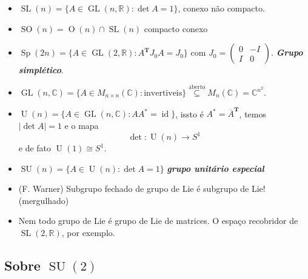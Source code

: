 \begin{example}
\begin{itemize}
\begin{itemize}
	\item $\operatorname{SL}(n) =\{A\in\operatorname{GL}(n,\mathbb{R}):\det A=1\}$, conexo n\~ao compacto.

	\item $\operatorname{SO}(n) =\operatorname{O}(n) \cap \operatorname{SL}(n)$ compacto conexo

	\item $\operatorname{Sp}(2n) =\{A\in\operatorname{GL}(2,\mathbb{R}):A^{\mathbf{T}}J_0A=J_0\}$ com $J_0=\begin{pmatrix} 0&-I\\I&0 \end{pmatrix} $. \textit{\textbf{Grupo simpl\'etico}}.

	\item $\operatorname{GL}(n,\mathbb{C})=\{A\in M_{n\times n}(\mathbb{C}):\text{invertiveis} \} \overset{\text{aberto} }{\subseteq}M_n(\mathbb{C})=\mathbb{C}^{n^2}$.

	\item $\operatorname{U}(n) =\{A\in\operatorname{GL}(n,\mathbb{C}):A A^*=\operatorname{id}\}$, issto \'e $A^*=\overline{A}^{\mathbf{T}}$, temos $|\det A| =1$ e o mapa
		\[\det :\operatorname{U}(n)\to S^1\]
		e de fato $\operatorname{U}(1) \cong S^1$.

	\item $\operatorname{SU}(n) = \{A\in\operatorname{U}(n) :\det A=1\}$ \textit{\textbf{grupo unit\'ario especial}}
		
		\end{itemize}
	\end{itemize}	
\end{example}

\begin{remark}\leavevmode 
	\begin{itemize}
	\item 	\begin{thm}[de Cartan]\leavevmode
		(F. Warner) Subgrupo fechado de grupo de Lie \'e subgrupo de Lie! (mergulhado)
	\end{thm}

	\item Nem todo grupo de Lie \'e grupo de Lie de matrices. O espaço recobridor de $\operatorname{SL}(2,\mathbb{R})$, por exemplo.
	\end{itemize}
\end{remark}

\subsection{Sobre $\operatorname{SU}(2)$}

